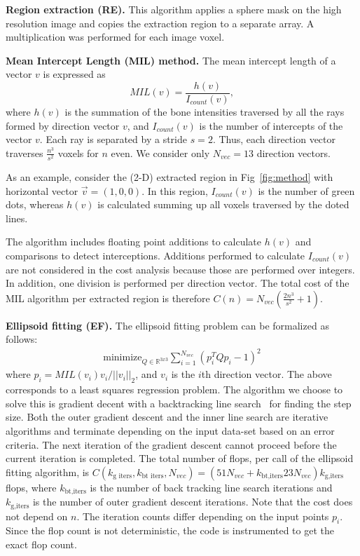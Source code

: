 \documentclass[letterpaper]{article}
\newcommand{\mypar}[1]{{\bf #1.}}
\begin{document}
\mypar{Region extraction (RE)}
This algorithm applies a sphere mask on the high resolution image and copies the extraction region to a separate array. A multiplication was performed for each image voxel.

\mypar{Mean Intercept Length (MIL) method} The mean intercept length of a vector ${v}$ is expressed as
\begin{equation}
  MIL({v}) = \frac{h({v})}{I_{count}({v})},
\end{equation}
where $h(v)$ is the summation of the bone intensities traversed by all the rays formed by direction vector $v$, and $I_{count}(v)$ is the number of intercepts of the vector $v$.  Each ray is separated by a stride $s=2$. Thus, each direction vector traverses $\frac{n^3}{s^2}$ voxels for $n$ even. We consider only $N_{vec}=13$ direction vectors.

As an example, consider the (2-D) extracted region in Fig~\ref{fig:method} with horizontal vector $\vec{v} = (1,0,0)$. In this region, $I_{count}(v)$ is the number of green dots, whereas $h({v})$ is calculated summing up all voxels traversed by the doted lines.


The algorithm includes floating point additions to calculate $h({v})$ and comparisons to detect interceptions. Additions performed to calculate $I_{count}(v)$ are not considered in the cost analysis because those are performed over integers. In addition, one division is performed per direction vector. The total cost of the MIL algorithm per extracted region is therefore $C(n) = N_{vec}(\frac{2n^3}{s^2}+1)$.

\mypar{Ellipsoid fitting (EF)}  
The ellipsoid fitting problem can be formalized as follows:
\begin{align}
  \mathrm{minimize}_{Q\in\mathbb{R}^{3x3}} \sum_{i=1}^{N_{vec}} (p_i^T Q p_i - 1)^2
\end{align}
where $p_i = MIL(v_i) v_i/||v_i||_2$, and $v_i$ is the $i$th direction vector. The above corresponds to a least squares regression problem. The algorithm we choose to solve this is gradient decent with a backtracking line search~\cite{boyd2004convex} for finding the step size. Both the outer gradient descent and the inner line search are iterative algorithms and terminate depending on the input data-set based on an error criteria. The next iteration of the gradient descent cannot proceed before the current iteration is completed. The total number of flops, per call of the ellipsoid fitting algorithm, is  $C(k_\text{g iters},k_\text{bt iters},N_{vec}) = (51N_{vec} + k_\text{bt,iters}23N_{vec})k_\text{g,iters}$ flops, where $k_\text{bt,iters}$ is the number of back tracking line search iterations and $k_\text{g,iters}$ is the number of outer gradient descent iterations. Note that the cost does not depend on $n$. The iteration counts differ depending on the input points $p_i$. Since the flop count is not deterministic, the code is instrumented to get the exact flop count. 
\end{document}
